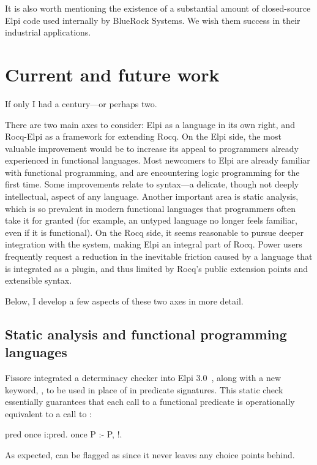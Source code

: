 \documentclass[a4paper, 11pt]{book}
\begin{document}
It is also worth mentioning the existence of a substantial amount of closed-source Elpi code used internally by BlueRock Systems. We wish them success in their industrial applications.

\section{Current and future work}

If only I had a century—or perhaps two. 

There are two main axes to consider:
Elpi as a language in its own right, and Rocq-Elpi as a framework for extending
Rocq. On the Elpi side, the most valuable improvement would be to increase its
appeal to programmers already experienced in functional languages. Most
newcomers to Elpi are already familiar with functional programming, and are
encountering logic programming for the first time. Some improvements relate to
syntax—a delicate, though not deeply intellectual, aspect of any language.
Another important area is static analysis, which is so prevalent in modern
functional languages that programmers often take it for granted (for example,
an untyped language no longer feels familiar, even if it is functional). On the
Rocq side, it seems reasonable to pursue deeper integration with the system,
making Elpi an integral part of Rocq. Power users frequently request a
reduction in the inevitable friction caused by a language that is integrated as
a plugin, and thus limited by Rocq’s public extension points and extensible
syntax.

Below, I develop a few aspects of these two axes in more detail.

\subsection{Static analysis and functional programming languages} 

Fissore
integrated a determinacy checker into Elpi 3.0~\cite{elpidet}, along with a new
keyword, , to be used in place of  in predicate
signatures. This static check essentially guarantees that each call to a
functional predicate  is operationally equivalent to a call to
:

\begin{elpicode}
pred once i:pred.
once P :- P, !.
\end{elpicode}

\noindent As expected,  can be flagged as  since it never
leaves any choice points behind.
\end{document}
